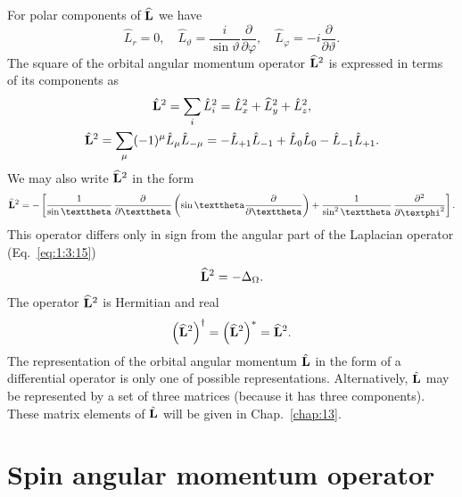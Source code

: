 For polar components of $\widehat{\mathbf{L}}$ we have
\begin{equation}
\hat{L}_{r}=0, \quad \hat{L}_{\vartheta}=\frac{i}{\sin \vartheta} \frac{\partial}{\partial \varphi}, \quad \hat{L}_{\varphi}=-i \frac{\partial}{\partial \vartheta} . \label{eq:2:2:19}
\end{equation}
The square of the orbital angular momentum operator $\widehat{\mathbf{L}}^{2}$ is expressed in terms of its components as
\begin{gather}
\hat{\mathbf{L}}^{2}=\sum_{i} \hat{L}_{i}^{2}=\hat{L}_{x}^{2}+\widehat{L}_{y}^{2}+\hat{L}_{z}^{2}  ,\notag\\
\hat{\mathbf{L}}^{2}=\sum_{\mu}(-1)^{\mu} \hat{L}_{\mu} \hat{L}_{-\mu}=-\hat{L}_{+1} \hat{L}_{-1}+\hat{L}_{0} \hat{L}_{0}-\hat{L}_{-1} \hat{L}_{+1}. \label{eq:2:2:20}
\end{gather}
We may also write $\widehat{\mathbf{L}}^{2}$ in the form
\begin{equation}
\widehat{\vect{L}}^{2}=-\left[\frac{1}{\sin \vartheta} \, \frac{\partial}{\partial \vartheta}\left(\sin \vartheta \frac{\partial}{\partial \vartheta}\right)+\frac{1}{\sin ^{2} \vartheta} \, \frac{\partial^{2}}{\partial \varphi^{2}}\right] . \label{eq:2:2:21}
\end{equation}
This operator differs only in sign from the angular part of the Laplacian operator (Eq.~\eqref{eq:1:3:15})
\begin{equation}
\widehat{\mathbf{L}}^{2}=-\Delta_{\Omega} . \label{eq:2:2:22}
\end{equation}
The operator $\widehat{\mathbf{L}}^{2}$ is Hermitian and real
\begin{equation}
\left(\widehat{\mathbf{L}}^{2}\right)^{\dagger}=\left(\widehat{\mathbf{L}}^{2}\right)^{*}=\widehat{\mathbf{L}}^{2} .\label{eq:2:2:23}
\end{equation}
The representation of the orbital angular momentum $\hat{\mathbf{L}}$ in the form of a differential operator is only one of possible representations. Alternatively, $\hat{\mathbf{L}}$ may be represented by a set of three matrices (because it has three components). These matrix elements of $\hat{\mathbf{L}}$ will be given in Chap.~\ref{chap:13}.

\section{Spin angular momentum operator} \label{sec:2.3}
